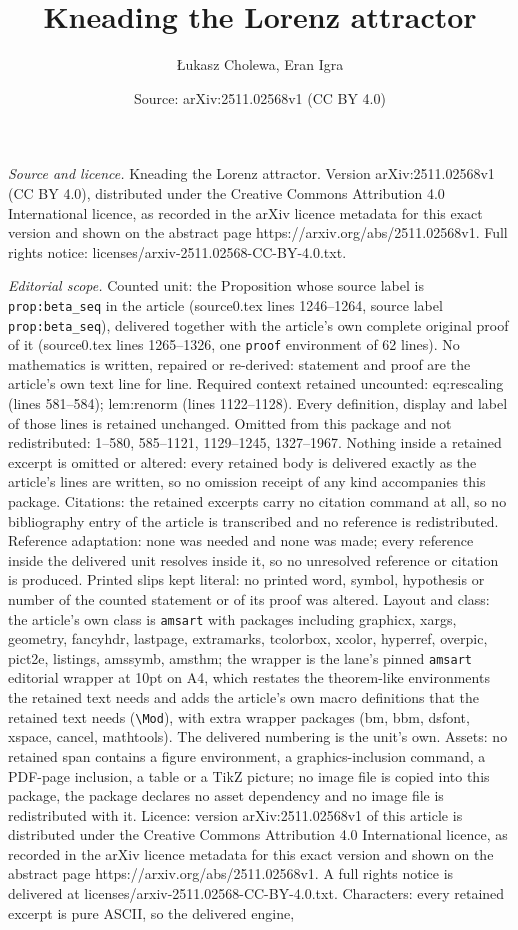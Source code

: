 \documentclass[10pt,a4paper]{amsart}
\title[Kneading the Lorenz attractor]{Kneading the Lorenz attractor}
\author{{\L}ukasz Cholewa, Eran Igra}
\date{Source: arXiv:2511.02568v1 (CC BY 4.0)}
\begin{document}
\maketitle

\noindent\emph{Source and licence.} Kneading the Lorenz attractor. Version arXiv:2511.02568v1 (CC BY 4.0), distributed under the Creative Commons Attribution 4.0 International licence, as recorded in the arXiv licence metadata for this exact version and shown on the abstract page https://arxiv.org/abs/2511.02568v1. Full rights notice: licenses/arxiv-2511.02568-CC-BY-4.0.txt.\par\smallskip

\noindent\textit{Editorial scope.} Counted unit: the Proposition whose source label is \texttt{prop:beta\_seq} in the article (source0.tex lines 1246--1264, source label \texttt{prop:beta\_seq}), delivered together with the article's own complete original proof of it (source0.tex lines 1265--1326, one \texttt{proof} environment of 62 lines). No mathematics is written, repaired or re-derived: statement and proof are the article's own text line for line. Required context retained uncounted: eq:rescaling (lines 581--584); lem:renorm (lines 1122--1128). Every definition, display and label of those lines is retained unchanged. Omitted from this package and not redistributed: 1--580, 585--1121, 1129--1245, 1327--1967. Nothing inside a retained excerpt is omitted or altered: every retained body is delivered exactly as the article's lines are written, so no omission receipt of any kind accompanies this package. Citations: the retained excerpts carry no citation command at all, so no bibliography entry of the article is transcribed and no reference is redistributed. Reference adaptation: none was needed and none was made; every reference inside the delivered unit resolves inside it, so no unresolved reference or citation is produced. Printed slips kept literal: no printed word, symbol, hypothesis or number of the counted statement or of its proof was altered. Layout and class: the article's own class is \texttt{amsart} with packages including graphicx, xargs, geometry, fancyhdr, lastpage, extramarks, tcolorbox, xcolor, hyperref, overpic, pict2e, listings, amssymb, amsthm; the wrapper is the lane's pinned \texttt{amsart} editorial wrapper at 10pt on A4, which restates the theorem-like environments the retained text needs and adds the article's own macro definitions that the retained text needs (\texttt{\textbackslash Mod}), with extra wrapper packages (bm, bbm, dsfont, xspace, cancel, mathtools). The delivered numbering is the unit's own. Assets: no retained span contains a figure environment, a graphics-inclusion command, a PDF-page inclusion, a table or a TikZ picture; no image file is copied into this package, the package declares no asset dependency and no image file is redistributed with it. Licence: version arXiv:2511.02568v1 of this article is distributed under the Creative Commons Attribution 4.0 International licence, as recorded in the arXiv licence metadata for this exact version and shown on the abstract page https://arxiv.org/abs/2511.02568v1. A full rights notice is delivered at licenses/arxiv-2511.02568-CC-BY-4.0.txt. Characters: every retained excerpt is pure ASCII, so the delivered engine, 
\end{document}
